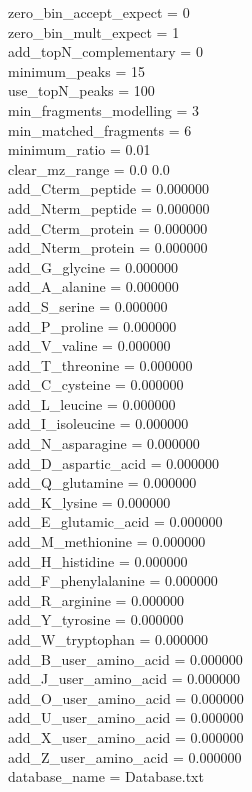 \documentclass [11pt] {article}
\begin{document}
	zero\_bin\_accept\_expect = 0 \\		
	zero\_bin\_mult\_expect = 1 \\		
	add\_topN\_complementary = 0 \\
	minimum\_peaks = 15 \\	
	use\_topN\_peaks = 100 \\
	min\_fragments\_modelling = 3 \\
	min\_matched\_fragments = 6 \\
	minimum\_ratio = 0.01 \\	
	clear\_mz\_range = 0.0 0.0 \\			
	add\_Cterm\_peptide = 0.000000 \\
	add\_Nterm\_peptide = 0.000000 \\
	add\_Cterm\_protein = 0.000000 \\
	add\_Nterm\_protein = 0.000000 \\
	add\_G\_glycine = 0.000000 \\ 
	add\_A\_alanine = 0.000000 \\
	add\_S\_serine = 0.000000 \\
	add\_P\_proline = 0.000000 \\
	add\_V\_valine = 0.000000 \\
	add\_T\_threonine = 0.000000 \\
	add\_C\_cysteine = 0.000000 \\
	add\_L\_leucine = 0.000000 \\
	add\_I\_isoleucine = 0.000000 \\ 
	add\_N\_asparagine = 0.000000 \\
	add\_D\_aspartic\_acid = 0.000000 \\
	add\_Q\_glutamine = 0.000000 \\
	add\_K\_lysine = 0.000000 \\
	add\_E\_glutamic\_acid = 0.000000 \\
	add\_M\_methionine = 0.000000 \\
	add\_H\_histidine = 0.000000 \\
	add\_F\_phenylalanine = 0.000000 \\
	add\_R\_arginine = 0.000000 \\
	add\_Y\_tyrosine = 0.000000 \\
	add\_W\_tryptophan = 0.000000 \\
	add\_B\_user\_amino\_acid = 0.000000 \\
	add\_J\_user\_amino\_acid = 0.000000 \\
	add\_O\_user\_amino\_acid = 0.000000 \\
	add\_U\_user\_amino\_acid = 0.000000 \\
	add\_X\_user\_amino\_acid = 0.000000 \\
	add\_Z\_user\_amino\_acid = 0.000000 \\
	database\_name = Database.txt \\
	
\end{document}
